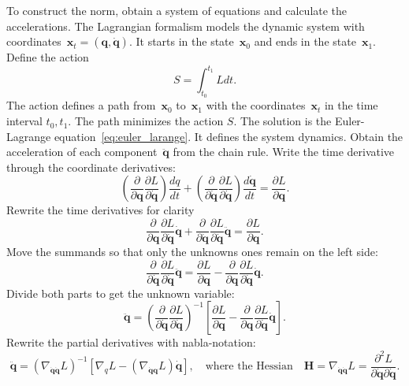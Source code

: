 \documentclass[12pt]{paper}
\begin{document}
To construct the norm, obtain a system of equations  and calculate the accelerations. The Lagrangian formalism models the dynamic system with coordinates~$\mathbf{x}_t = (\mathbf{q}, \dot{\mathbf{q}})$. It starts in the state~$\mathbf{x}_0$ and ends in the state~$\mathbf{x}_1$. Define the action  
\[ %
S=\int_{t_{0}}^{t_{1}} L d t.
\]%
The action defines a path from~$\mathbf{x}_0$ to~$\mathbf{x}_1$ with the coordinates~$\mathbf{x}_t$ in the time interval $t_0, t_1$. The path minimizes the action $S$. %
The solution is the Euler-Lagrange equation~\eqref{eq:euler_larange}. It defines the system dynamics. 
Obtain the acceleration of each component~$ \ddot{\mathbf{q}}$ from the chain rule. Write the time derivative through the coordinate derivatives:
\[
\left(\frac{\partial}{\partial \mathbf{q}} \frac{\partial L}{\partial \dot{\mathbf{q}}} \right) \frac{d q}{d t}+\left(\frac{\partial}{\partial \dot{\mathbf{q}}} \frac{\partial L}{\partial \dot{\mathbf{q}}} \right)  \frac{d \dot{\mathbf{q}}}{d t}
= \frac{\partial L}{\partial \mathbf{q}}.
\]
Rewrite the time derivatives for clarity
\[
\frac{\partial}{\partial \mathbf{q}} \frac{\partial L}{\partial \dot{\mathbf{q}}} \dot{\mathbf{q}}+\frac{\partial}{\partial \dot{\mathbf{q}}} \frac{\partial L}{\partial \dot{\mathbf{q}}} \ddot{\mathbf{q}} 
= \frac{\partial L}{\partial \mathbf{q}}.
\]
Move the summands so that only the unknowns ones remain on the left side:
\[
\frac{\partial}{\partial \dot{\mathbf{q}}} \frac{\partial L}{\partial \dot{\mathbf{q}}} \ddot{\mathbf{q}} 
= \frac{\partial L}{\partial \mathbf{q}}-\frac{\partial}{\partial \mathbf{q}} \frac{\partial L}{\partial \dot{\mathbf{q}}} \dot{\mathbf{q}}.
\]
Divide both parts to get  the unknown variable:
\[
\ddot{\mathbf{q}} 
= \left(\frac{\partial}{\partial \dot{\mathbf{q}}} \frac{\partial L}{\partial \dot{\mathbf{q}}}\right)^{-1}\left[\frac{\partial L}{\partial \mathbf{q}}-\frac{\partial}{\partial \mathbf{q}} \frac{\partial L}{\partial \dot{\mathbf{q}}} \dot{\mathbf{q}}\right].
\]
Rewrite the partial derivatives with nabla-notation:
\begin{equation}
\ddot{\mathbf{q}} 
= \left(\nabla_{\dot{\mathbf{q}} \dot{\mathbf{q}}} L\right)^{-1}\left[\nabla_{q} L-\left(\nabla_{\dot{\mathbf{q}}\mathbf{q}} L\right) \dot{\mathbf{q}}\right], \quad\text{where the Hessian}\quad
\mathbf{H} = \nabla_{\dot{\mathbf{q}}\dot{\mathbf{q}}} L = \frac{\partial^{2} L}{\partial \dot{\mathbf{q}} \partial \dot{\mathbf{q}}}.
\end{equation}
\end{document}
